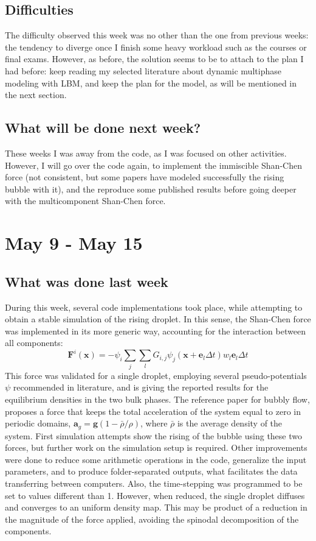 \documentclass[12pt]{article}
\begin{document}
	\subsection*{Difficulties}
	The difficulty observed this week was no other than the one from previous weeks: the tendency to diverge once I finish some heavy workload such as the courses or final exams. However, as before, the solution seems to be to attach to the plan I had before: keep reading my selected literature about dynamic multiphase modeling with LBM, and keep the plan for the model, as will be mentioned in the next section.
	\subsection*{What will be done next week?}
	These weeks I was away from the code, as I was focused on other activities. However, I will go over the code again, to implement the immiscible Shan-Chen force (not consistent, but some papers have modeled successfully the rising bubble with it), and the reproduce some published results before going deeper with the multicomponent Shan-Chen force. 
	
	\pagebreak
	\section*{May 9 - May 15}
	\subsection*{What was done last week}
	During this week, several code implementations took place, while attempting to obtain a stable simulation of the rising droplet. In this sense, the Shan-Chen force was implemented in its more generic way, accounting for the interaction between all components:
	\begin{equation*}
		\mathbf{F}^i (\mathbf{x}) = - \psi_i \sum_j \sum_l G_{i,j} \psi_j (\mathbf{x} + \mathbf{e}_l \Delta t) w_l \mathbf{e}_l \Delta t
	\end{equation*}
	This force was validated for a single droplet, employing several pseudo-potentials $\psi$ recommended in literature, and is giving the reported results for the equilibrium densities in the two bulk phases. The reference paper for bubbly flow, proposes a force that keeps the total acceleration of the system equal to zero in periodic domains, $\mathbf{a}_g =  \mathbf{g} (1- \bar{\rho}/\rho)$, where $\bar{\rho}$ is the average density of the system. First simulation attempts show the rising of the bubble using these two forces, but further work on the simulation setup is required. Other improvements were done to reduce some arithmetic operations in the code, generalize the input parameters, and to produce folder-separated outputs, what facilitates the data transferring between computers. Also, the time-stepping was programmed to be set to values different than 1. However, when reduced, the single droplet diffuses and converges to an uniform density map. This may be product of a reduction in the magnitude of the force applied, avoiding the spinodal decomposition of the components. 
	
\end{document}
